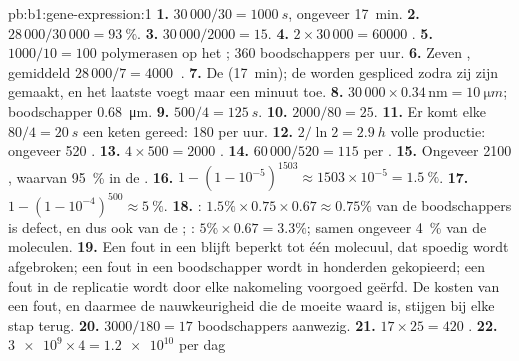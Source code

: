 \begin{solution}{pb:b1:gene-expression:1}
\textbf{1.} $30\,000/30 = \qty{1000}{s}$, ongeveer \qty{17}{min}.
\textbf{2.} $28\,000/30\,000 = \qty{93}{\%}$.
\textbf{3.} $30\,000/2000 = 15$.
\textbf{4.} $2\times 30\,000 = \num{60000}$ .
\textbf{5.} $1000/10 = 100$ polymerasen op het ; 360 boodschappers per uur.
\textbf{6.} Zeven , gemiddeld $28\,000/7 = \qty{4000}{}$ .
\textbf{7.} De  (\qty{17}{min}); de  worden gespliced zodra zij
zijn gemaakt, en het laatste voegt maar een minuut toe.
\textbf{8.}  $30\,000\times 0.34\,\mathrm{nm} = \qty{10}{\micro m}$; boodschapper \qty{0.68}{\micro m}.
\textbf{9.} $500/4 = \qty{125}{s}$.
\textbf{10.} $2000/80 = 25$.
\textbf{11.} Er komt elke $80/4 = \qty{20}{s}$ een keten gereed: 180 per uur.
\textbf{12.} $2/\ln 2 = \qty{2.9}{h}$ volle productie: ongeveer 520 .
\textbf{13.} $4\times 500 = 2000$ .
\textbf{14.} $60\,000/520 = 115$  per .
\textbf{15.} Ongeveer 2100 , waarvan \qty{95}{\%} in de .
\textbf{16.} $1 - (1 - 10^{-5})^{1503} \approx 1503\times 10^{-5} =
\qty{1.5}{\%}$.
\textbf{17.} $1 - (1 - 10^{-4})^{500} \approx \qty{5}{\%}$.
\textbf{18.} : $1.5\%\times 0.75\times 0.67 \approx
0.75\%$ van de boodschappers is defect, en dus ook van de ; :
$5\%\times 0.67 = 3.3\%$; samen ongeveer \qty{4}{\%} van de moleculen.
\textbf{19.} Een fout in een  blijft beperkt tot één molecuul, dat spoedig
wordt afgebroken; een fout in een boodschapper wordt in honderden 
gekopieerd; een fout in de replicatie wordt door elke nakomeling voorgoed geërfd.
De kosten van een fout, en daarmee de nauwkeurigheid die de moeite waard is,
stijgen bij elke stap terug.
\textbf{20.} $3000/180 = 17$ boodschappers aanwezig.
\textbf{21.} $17\times 25 = 420$ .
\textbf{22.} $\num{3e9}\times 4 = \num{1.2e10}$  per dag

\end{solution}
